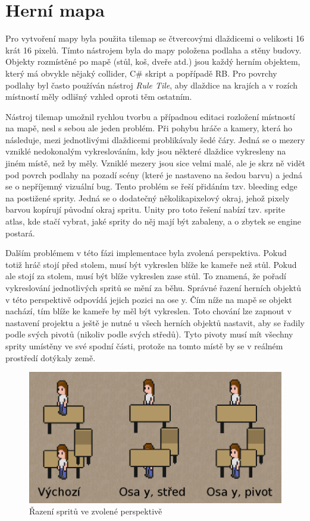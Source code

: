 \documentclass[FM,Proj]{tulthesis}
\begin{document}
	\section{Herní mapa} %
	
	Pro vytvoření mapy byla použita tilemap se čtvercovými dlaždicemi o velikosti 16 krát 16 pixelů. Tímto nástrojem byla do mapy položena podlaha a stěny budovy. Objekty rozmístěné po mapě (stůl, koš, dveře atd.) jsou každý herním objektem, který má obvykle nějaký collider, C\# skript a popřípadě RB. Pro povrchy podlahy byl často používán nástroj \textit{Rule Tile}, aby dlaždice na krajích a v rozích místností měly odlišný vzhled oproti těm ostatním.
	
	Nástroj tilemap umožnil rychlou tvorbu a případnou editaci rozložení místností na mapě, nesl s sebou ale jeden problém. Při pohybu hráče a kamery, která ho následuje, mezi jednotlivými dlaždicemi problikávaly šedé čáry. Jedná se o mezery vzniklé nedokonalým vykreslováním, kdy jsou některé dlaždice vykresleny na jiném místě, než by měly. Vzniklé mezery jsou sice velmi malé, ale je skrz ně vidět pod povrch podlahy na pozadí scény (které je nastaveno na šedou barvu) a jedná se o nepříjemný vizuální bug. Tento problém se řeší přidáním tzv. bleeding edge na postižené sprity. Jedná se o dodatečný několikapixelový okraj, jehož pixely barvou kopírují původní okraj spritu. Unity pro toto řešení nabízí tzv. sprite atlas, kde stačí vybrat, jaké sprity do něj mají být zabaleny, a o zbytek se engine postará.
	
	Dalším problémem v této fázi implementace byla zvolená perspektiva. Pokud totiž hráč stojí před stolem, musí být vykreslen blíže ke kameře než stůl. Pokud ale stojí za stolem, musí být blíže vykreslen zase stůl. To znamená, že pořadí vykreslování jednotlivých spritů se mění za běhu. Správné řazení herních objektů v této perspektivě odpovídá jejich pozici na ose y. Čím níže na mapě se objekt nachází, tím blíže ke kameře by měl být vykreslen. Toto chování lze zapnout v nastavení projektu a ještě je nutné u všech herních objektů nastavit, aby se řadily podle svých pivotů (nikoliv podle svých středů). Tyto pivoty musí mít všechny sprity umístěny ve své spodní části, protože na tomto místě by se v reálném prostředí dotýkaly země.
	
	\begin{figure}[ht]
		\centering
		\includegraphics[width=\textwidth]{img/SpriteSort}
		\caption{Řazení spritů ve zvolené perspektivě}		
	\end{figure}
	
\end{document}
